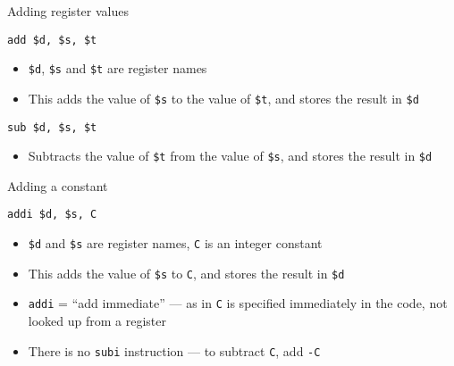 \begin{frame}[fragile]{Adding register values}
	\pause
	\begin{lstlisting}
add $d, $s, $t
	\end{lstlisting}
	\begin{itemize}
		\pause\item \lstinline{$d}, \lstinline{$s} and \lstinline{$t} are register names
		\pause\item This adds the value of \lstinline{$s} to the value of \lstinline{$t},
			and stores the result in \lstinline{$d}
	\end{itemize}
	\pause
	\begin{lstlisting}
sub $d, $s, $t
	\end{lstlisting}
	\begin{itemize}
		\pause\item Subtracts the value of \lstinline{$t} from the value of \lstinline{$s},
			and stores the result in \lstinline{$d}
	\end{itemize}
\end{frame}

\begin{frame}[fragile]{Adding a constant}
	\pause
	\begin{lstlisting}
addi $d, $s, C
	\end{lstlisting}
	\begin{itemize}
		\pause\item \lstinline{$d} and \lstinline{$s} are register names, \lstinline{C} is an integer constant
		\pause\item This adds the value of \lstinline{$s} to \lstinline{C},
			and stores the result in \lstinline{$d}
		\pause\item \lstinline{addi} = ``add immediate''
			--- as in \lstinline{C} is specified immediately in the code, not looked up from a register
		\pause\item There is no \lstinline{subi} instruction --- to subtract \lstinline{C},
			add \lstinline{-C}
	\end{itemize}
\end{frame}

